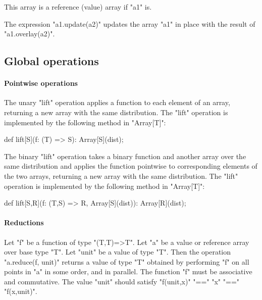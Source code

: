 This array is a reference (value) array if \xcd"a1" is.

The expression \xcd"a1.update(a2)" updates the array \xcd"a1" in place
with the result of \xcd"a1.overlay(a2)".




\subsection{Global operations }

\paragraph{Pointwise operations}\label{ArrayPointwise}
The unary \xcd"lift" operation applies a function to each element of
an array, returning a new array with the same distribution.
The \xcd"lift" operation is implemented by the following method
in \xcd"Array[T]":
\begin{xten}
def lift[S](f: (T) => S): Array[S](dist);
\end{xten}

The binary \xcd"lift" operation takes a binary function and
another
array over the same distribution and applies the function
pointwise to corresponding elements of the two arrays, returning
a new array with the same distribution.
The \xcd"lift" operation is implemented by the following method
in \xcd"Array[T]":
\begin{xten}
def lift[S,R](f: (T,S) => R, Array[S](dist)): Array[R](dist);
\end{xten}

\paragraph{Reductions}\label{ArrayReductions}

Let \xcd"f" be a function of type \xcd"(T,T)=>T".  Let
\xcd"a" be a value or reference array over base type \xcd"T".
Let \xcd"unit" be a value of type \xcd"T".
Then the
operation \xcd"a.reduce(f, unit)" returns a value of type \xcd"T" obtained
by performing \xcd"f" on all points in \xcd"a" in some order, and in
parallel.  The function \xcd"f" must be associative and
commutative.  The value \xcd"unit" should satisfy
\xcd"f(unit,x)" \xcd"==" \xcd"x" \xcd"==" \xcd"f(x,unit)".

